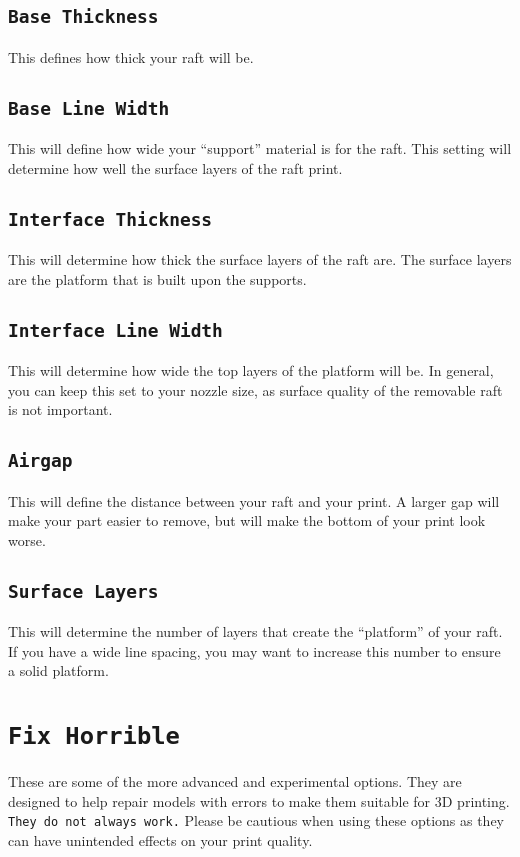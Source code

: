 \subsection{\texttt{Base Thickness}}
This defines how thick your raft will be.

\subsection{\texttt{Base Line Width}}
This will define how wide your “support” material is for the raft. This setting will determine how well the surface layers of the raft print.

\subsection{\texttt{Interface Thickness}}
This will determine how thick the surface layers of the raft are. The surface layers are the platform that is built upon the supports.

\subsection{\texttt{Interface Line Width}}
This will determine how wide the top layers of the platform will be. In general, you can keep this set to your nozzle size, as surface quality of the removable raft is not important.

\subsection{\texttt{Airgap}}
This will define the distance between your raft and your print. A larger gap will make your part easier to remove, but will make the bottom of your print look worse.

\subsection{\texttt{Surface Layers}}
This will determine the number of layers that create the “platform” of your raft. If you have a wide line spacing, you may want to increase this number to ensure a solid platform. 

\section{\texttt{Fix Horrible}}
These are some of the more advanced and experimental options. They are designed to help repair models with errors to make them suitable for 3D printing. \texttt{They do not always work.} Please be cautious when using these options as they can have unintended effects on your print quality.

